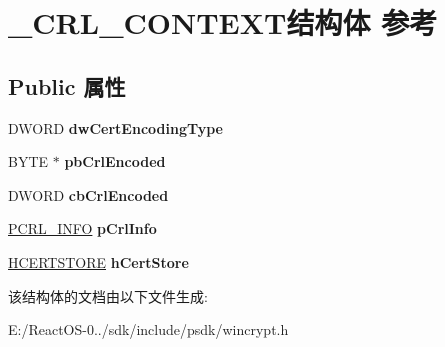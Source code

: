 \hypertarget{struct___c_r_l___c_o_n_t_e_x_t}{}\section{\+\_\+\+C\+R\+L\+\_\+\+C\+O\+N\+T\+E\+X\+T结构体 参考}
\label{struct___c_r_l___c_o_n_t_e_x_t}
\subsection*{Public 属性}
\begin{DoxyCompactItemize}
\item 
\mbox{\label{struct___c_r_l___c_o_n_t_e_x_t_a130b7f99de12ea169cfe1f3e297b838a}} 
D\+W\+O\+RD {\bfseries dw\+Cert\+Encoding\+Type}
\item 
\mbox{\label{struct___c_r_l___c_o_n_t_e_x_t_a9e28473a63a648599b85196475171842}} 
B\+Y\+TE $\ast$ {\bfseries pb\+Crl\+Encoded}
\item 
\mbox{\label{struct___c_r_l___c_o_n_t_e_x_t_a0a129c822752a96bef5a40979050368a}} 
D\+W\+O\+RD {\bfseries cb\+Crl\+Encoded}
\item 
\mbox{\label{struct___c_r_l___c_o_n_t_e_x_t_ade17cdcdaee0e20214aaa56148247085}} 
\hyperlink{struct___c_r_l___i_n_f_o}{P\+C\+R\+L\+\_\+\+I\+N\+FO} {\bfseries p\+Crl\+Info}
\item 
\mbox{\label{struct___c_r_l___c_o_n_t_e_x_t_a8fd51fefdc110b5c5cc22ebec83d25a0}} 
\hyperlink{interfacevoid}{H\+C\+E\+R\+T\+S\+T\+O\+RE} {\bfseries h\+Cert\+Store}
\end{DoxyCompactItemize}


该结构体的文档由以下文件生成\+:\begin{DoxyCompactItemize}
\item 
E\+:/\+React\+O\+S-\/0../sdk/include/psdk/wincrypt.\+h\end{DoxyCompactItemize}
